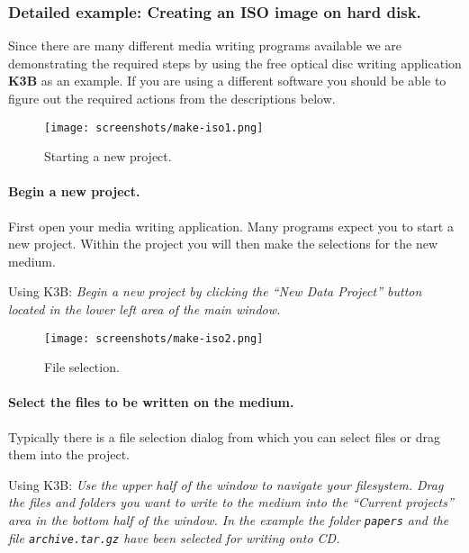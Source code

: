 \newpage
\subsubsection{Detailed example: Creating an ISO image on hard disk.}
\label{howto-augment-make-iso}

Since there are many different media writing programs available we are
demonstrating the required steps by using the free optical disc writing
application {\bf K3B} as an example. If you are using a different software
you should be able to figure out the required actions from the descriptions below.

\begin{figure}[h]
\centerline{\texttt{[image: screenshots/make-iso1.png]}}
\caption{Starting a new project.}  
\label{howto-augment-make-iso-new-project}
\end{figure}

\paragraph{Begin a new project.} First open your media
writing application. Many programs expect you to start a new project.
Within the project you will then make the selections for the new medium.

\bigskip

Using K3B: {\em Begin a new project by clicking the ``New Data Project''
  button located in the lower left area of the main window.} 

\newpage
\begin{figure}[h]
\centerline{\texttt{[image: screenshots/make-iso2.png]}}
\caption{File selection.}  
\label{howto-augment-make-iso-file-selection}
\end{figure}

\paragraph{Select the files to be written on the medium.} Typically there
is a file selection dialog from which you can select files or drag them into the project.

\medskip

Using K3B: {\em Use the upper half of the window to navigate your
  filesystem. Drag the files and folders you want to write to the
  medium into the ``Current projects'' area in the bottom half of the
  window. In the example the folder {\tt papers} and the file {\tt archive.tar.gz}
  have been selected for writing onto CD.}


